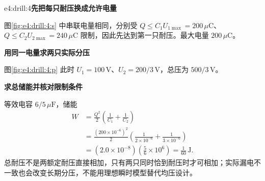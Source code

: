 \begin{drillsolution}{e4:drill:4}\textbf{先把每只耐压换成允许电量}\par\nobreak
图\ref{fig:e4:drill:4:s} 中串联电量相同，分别受 $Q\le C_1U_{1\max}=200\,\mu\mathrm C$、$Q\le C_2U_{2\max}=240\,\mu\mathrm C$ 限制，因此先达到第一只耐压。最大电量 $200\,\mu\mathrm C$。



\par\medskip{}\noindent\textbf{用同一电量求两只实际分压}\par\nobreak
图\ref{fig:e4:drill:4:p} 此时 $U_1=100\,\mathrm V$、$U_2=200/3\,\mathrm V$，总压为 $500/3\,\mathrm V$。

\par\medskip{}\noindent\textbf{求总储能并核对限制条件}\par\nobreak
等效电容 $6/5\,\mu\mathrm F$，储能
\[
\begin{aligned}
W&=\frac{Q^2}2\left(\frac1{C_1}+\frac1{C_2}\right)\\
&=\frac{(200\times10^{-6})^2}{2}
\left(\frac1{2\times10^{-6}}+\frac1{3\times10^{-6}}\right)\\
&=(2.0\times10^{-8})\left(\frac56\times10^6\right)
=\frac1{60}\,\mathrm J.
\end{aligned}
\]
总耐压不是两额定耐压直接相加，只有两只同时恰到耐压时才可相加；实际漏电不一致也会改变长期分压，不能用理想瞬时模型替代均压设计。\end{drillsolution}
